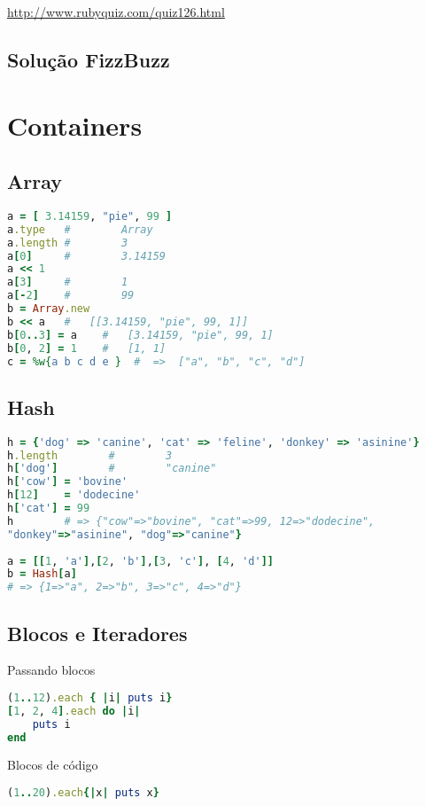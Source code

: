 \documentclass[serif,mathserif]{article}
\begin{document}
\url{http://www.rubyquiz.com/quiz126.html}

\subsection{Solução FizzBuzz}



\section{Containers}

\subsection{Array}
\begin{lstlisting}[language=ruby]
a = [ 3.14159, "pie", 99 ]
a.type   #        Array
a.length #        3
a[0]     #        3.14159
a << 1
a[3]     #        1
a[-2]    #        99
b = Array.new
b << a   #   [[3.14159, "pie", 99, 1]]
b[0..3] = a    #   [3.14159, "pie", 99, 1]
b[0, 2] = 1    #   [1, 1]
c = %w{a b c d e }  #  =>  ["a", "b", "c", "d"]
\end{lstlisting}


\subsection{Hash}
\begin{lstlisting}[language=ruby]
h = {'dog' => 'canine', 'cat' => 'feline', 'donkey' => 'asinine'}
h.length        #        3
h['dog']        #        "canine"
h['cow'] = 'bovine'
h[12]    = 'dodecine'
h['cat'] = 99
h        # => {"cow"=>"bovine", "cat"=>99, 12=>"dodecine",
"donkey"=>"asinine", "dog"=>"canine"}
  
a = [[1, 'a'],[2, 'b'],[3, 'c'], [4, 'd']]
b = Hash[a]
# => {1=>"a", 2=>"b", 3=>"c", 4=>"d"}
\end{lstlisting}


\subsection{Blocos e Iteradores}

Passando blocos
\begin{lstlisting}[language=ruby]
(1..12).each { |i| puts i}
[1, 2, 4].each do |i|
    puts i
end
\end{lstlisting}

Blocos de código
\begin{lstlisting}[language=ruby]
(1..20).each{|x| puts x}
\end{lstlisting}
\end{document}
